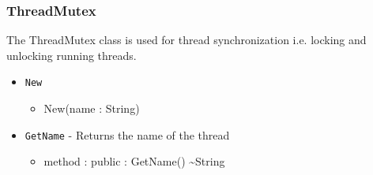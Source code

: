 \documentclass[12pt]{article}
\begin{document}
\subsubsection{ThreadMutex}
The ThreadMutex class is used for thread synchronization i.e. locking
and unlocking running threads.
\begin{itemize}
\item \texttt{New}
  \begin{itemize}
  \item New(name : String)
  \end{itemize}
\item \texttt{GetName} - Returns the name of the thread
  \begin{itemize}
  \item method : public : GetName() \textasciitilde String
  \end{itemize}
\end{itemize}
\end{document}
